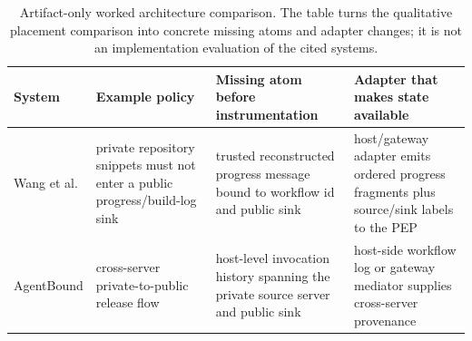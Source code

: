\begin{table}[t]
  \caption{Artifact-only worked architecture comparison. The table turns the
  qualitative placement comparison into concrete missing atoms and adapter
  changes; it is not an implementation evaluation of the cited systems.}
  \label{tab:worked-architecture-comparison}
  \centering\footnotesize
  \begin{tabular}{@{}p{}p{}p{}p{}@{}}
    \toprule
    System & Example policy & Missing atom before instrumentation & Adapter that makes state available \\
    \midrule
    Wang et al. & private repository snippets must not enter a public progress/build-log sink & trusted reconstructed progress message bound to workflow id and public sink & host/gateway adapter emits ordered progress fragments plus source/sink labels to the PEP \\
    AgentBound & cross-server private-to-public release flow & host-level invocation history spanning the private source server and public sink & host-side workflow log or gateway mediator supplies cross-server provenance \\
    \bottomrule
  \end{tabular}
\end{table}
